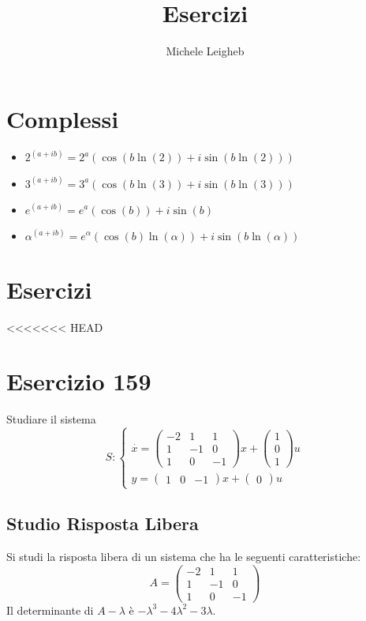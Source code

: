 \documentclass{article}
\title{Esercizi}
\author{Michele Leigheb}
\date{}
\begin{document}
\maketitle
\tableofcontents{}
\section{Complessi}
\begin{itemize}
	\item \(\displaystyle 2^{(a+ib)} = 2^a (\cos(b \ln(2)) + i\sin(b \ln(2))) \)
	\item \(\displaystyle 3^{(a+ib)} = 3^a (\cos(b \ln(3)) + i\sin(b \ln(3))) \)
	\item \(\displaystyle e^{(a+ib)} = e^a (\cos(b)) + i\sin(b) \)
	\item \(\displaystyle \alpha^{(a+ib)} = e^{\alpha} (\cos(b)\ln(\alpha)) + i\sin(b\ln(\alpha)) \)
\end{itemize}



\section{Esercizi}

<<<<<<< HEAD
\section{Esercizio 159 }
 Studiare il sistema \[S:\begin{cases}\overset{\cdot}{x} = \left(\begin{matrix}-2 & 1 & 1\\1 & -1 & 0\\1 & 0 & -1\end{matrix}\right) x+ \left(\begin{matrix}1\\0\\1\end{matrix}\right)u\\y = \left(\begin{matrix}1 & 0 & -1\end{matrix}\right) x +\left(\begin{matrix}0\end{matrix}\right) u\end{cases}\]\subsection{Studio Risposta Libera}
Si studi la risposta libera di un sistema che ha le seguenti caratteristiche: \[A = \left(\begin{matrix}-2 & 1 & 1\\1 & -1 & 0\\1 & 0 & -1\end{matrix}\right)\]
Il determinante di $A-\lambda$ è $ - \lambda^{3} - 4 \lambda^{2} - 3 \lambda $.
\end{document}
